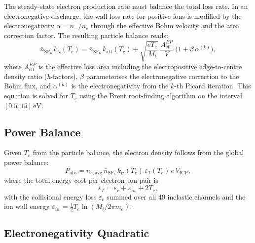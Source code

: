\documentclass[11pt,a4paper]{report}
\newcommand{\SFsix}{\mathrm{SF}_6}
\newcommand{\eV}{\,\mathrm{eV}}
\begin{document}
The steady-state electron production rate must balance the total loss rate.  In an electronegative discharge, the wall loss rate for positive ions is modified by the electronegativity $\alpha = n_-/n_e$ through the effective Bohm velocity and the area correction factor.  The resulting particle balance reads:
\begin{equation}
  \boxed{\bar{n}_{\SFsix}\,k_\mathrm{iz}(T_e) = \bar{n}_{\SFsix}\,k_\mathrm{att}(T_e) + \sqrt{\frac{eT_e}{M_i}}\;\frac{A_\mathrm{eff}^{EP}}{V}\;\bigl(1 + \beta\,\alpha^{(k)}\bigr),}
  \label{eq:particle-balance-EN}
\end{equation}
where $A_\mathrm{eff}^{EP}$ is the effective loss area including the electropositive edge-to-centre density ratio (\emph{h}-factors), $\beta$ parameterises the electronegative correction to the Bohm flux, and $\alpha^{(k)}$ is the electronegativity from the $k$-th Picard iteration.  This equation is solved for $T_e$ using the Brent root-finding algorithm on the interval $[0.5, 15]\eV$.

\subsection{Power Balance}

Given $T_e$ from the particle balance, the electron density follows from the global power balance:
\begin{equation}
  \boxed{P_\mathrm{abs} = n_{e,\mathrm{avg}}\,\bar{n}_{\SFsix}\,k_\mathrm{iz}(T_e)\,\varepsilon_T(T_e)\,e\,V_\mathrm{ICP},}
  \label{eq:power-balance-global}
\end{equation}
where the total energy cost per electron--ion pair is
\begin{equation}
  \varepsilon_T = \varepsilon_c + \varepsilon_{iw} + 2T_e,
\end{equation}
with the collisional energy loss $\varepsilon_c$ summed over all 49 inelastic channels and the ion wall energy $\varepsilon_{iw} = \frac{1}{2}T_e\ln(M_i/2\pi m_e)$.

\subsection{Electronegativity Quadratic}
\end{document}
